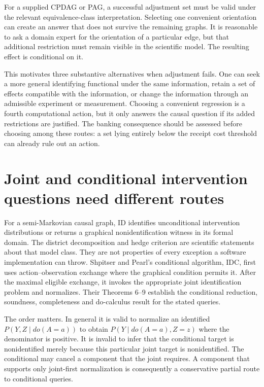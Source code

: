 For a supplied CPDAG or PAG, a successful adjustment set must be valid
under the relevant equivalence-class interpretation. Selecting one
convenient orientation can create an answer that does not survive the
remaining graphs. It is reasonable to ask a domain expert for the
orientation of a particular edge, but that additional restriction must
remain visible in the scientific model. The resulting effect is
conditional on it.

This motivates three substantive alternatives when adjustment fails.
One can seek a more general identifying functional under the same
information, retain a set of effects compatible with the information,
or change the information through an admissible experiment or
measurement. Choosing a convenient regression is a fourth computational
action, but it only answers the causal question if its added
restrictions are justified. The banking consequence should be assessed
before choosing among these routes: a set lying entirely below the
receipt cost threshold can already rule out an action.

\section{Joint and conditional intervention questions need different routes}
\label{exec17:s3-idc}

For a semi-Markovian causal graph, ID identifies unconditional
intervention distributions or returns a graphical nonidentification
witness in its formal domain. The district decomposition and hedge
criterion are scientific statements about that model class.
They are not properties of every exception a software implementation
can throw. Shpitser and Pearl's conditional algorithm, IDC, first
uses action--observation exchange where the graphical condition permits
it. After the maximal eligible exchange, it invokes the appropriate
joint identification problem and normalizes. Their Theorems 6--9
establish the conditional reduction, soundness, completeness and
do-calculus result for the stated
queries.~\citep{id2006}

The order matters. In general it is valid to normalize an identified
$P(Y,Z\mid do(A=a))$ to obtain $P(Y\mid do(A=a),Z=z)$
where the denominator is positive. It is invalid to infer that
the conditional target is nonidentified merely because this particular
joint target is nonidentified. The conditional may cancel a component
that the joint requires. A component that supports only joint-first
normalization is consequently a conservative partial route to
conditional queries.

